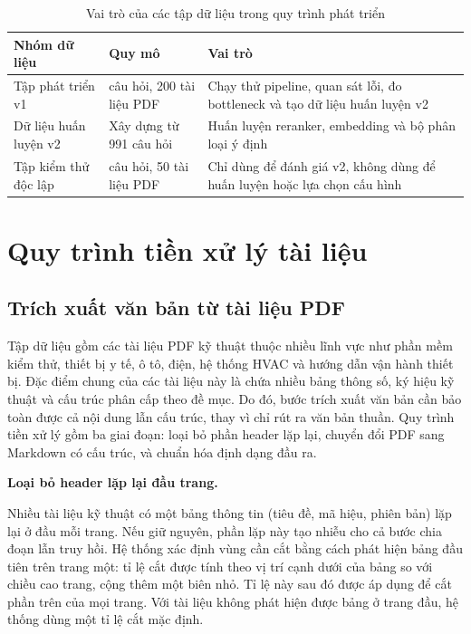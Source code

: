 \documentclass[../DoAn.tex]{subfiles}
\begin{document}
\begin{table}[H]
    \centering
    \caption{Vai trò của các tập dữ liệu trong quy trình phát triển}
    \label{tab:data-role}
    {\small
    \setlength{\tabcolsep}{4pt}
    \begin{tabular}{|>{\raggedright\arraybackslash}p{3.4cm}|>{\raggedright\arraybackslash}p{3.6cm}|>{\raggedright\arraybackslash}p{6.3cm}|}
        \hline
        \textbf{Nhóm dữ liệu} & \textbf{Quy mô} & \textbf{Vai trò} \\ \hline
        Tập phát triển v1 & 991 câu hỏi, 200 tài liệu PDF & Chạy thử pipeline, quan sát lỗi, đo bottleneck và tạo dữ liệu huấn luyện v2 \\ \hline
        Dữ liệu huấn luyện v2 & Xây dựng từ 991 câu hỏi & Huấn luyện reranker, embedding và bộ phân loại ý định \\ \hline
        Tập kiểm thử độc lập & 390 câu hỏi, 50 tài liệu PDF & Chỉ dùng để đánh giá v2, không dùng để huấn luyện hoặc lựa chọn cấu hình \\ \hline
    \end{tabular}
    }
\end{table}

\section{Quy trình tiền xử lý tài liệu}
\label{section:3.2}

\subsection{Trích xuất văn bản từ tài liệu PDF}
\label{subsection:3.2.1}

Tập dữ liệu gồm các tài liệu PDF kỹ thuật thuộc nhiều lĩnh vực như phần mềm kiểm thử, thiết bị y tế, ô tô, điện, hệ thống HVAC và hướng dẫn vận hành thiết bị. Đặc điểm chung của các tài liệu này là chứa nhiều bảng thông số, ký hiệu kỹ thuật và cấu trúc phân cấp theo đề mục. Do đó, bước trích xuất văn bản cần bảo toàn được cả nội dung lẫn cấu trúc, thay vì chỉ rút ra văn bản thuần. Quy trình tiền xử lý gồm ba giai đoạn: loại bỏ phần header lặp lại, chuyển đổi PDF sang Markdown có cấu trúc, và chuẩn hóa định dạng đầu ra.

\noindent\textbf{Loại bỏ header lặp lại đầu trang.}

Nhiều tài liệu kỹ thuật có một bảng thông tin (tiêu đề, mã hiệu, phiên bản) lặp lại ở đầu mỗi trang. Nếu giữ nguyên, phần lặp này tạo nhiễu cho cả bước chia đoạn lẫn truy hồi. Hệ thống xác định vùng cần cắt bằng cách phát hiện bảng đầu tiên trên trang một: tỉ lệ cắt được tính theo vị trí cạnh dưới của bảng so với chiều cao trang, cộng thêm một biên nhỏ. Tỉ lệ này sau đó được áp dụng để cắt phần trên của mọi trang. Với tài liệu không phát hiện được bảng ở trang đầu, hệ thống dùng một tỉ lệ cắt mặc định.
\end{document}
